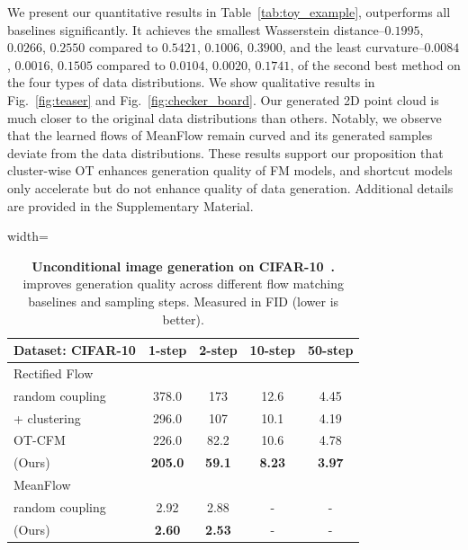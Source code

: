 We present our quantitative results in Table~\ref{tab:toy_example}, \method{} outperforms all baselines significantly.  It achieves the smallest Wasserstein distance--$0.1995$, $0.0266$, $0.2550$ compared to $0.5421$, $0.1006$, $0.3900$, and the least curvature--$0.0084$, $0.0016$, $0.1505$ compared to $0.0104$, $0.0020$, $0.1741$, of the second best method on the four types of data distributions.  We show qualitative results in Fig.~\ref{fig:teaser} and Fig.~\ref{fig:checker_board}.  Our generated 2D point cloud is much closer to the original data distributions than others.  Notably, we observe that the learned flows of MeanFlow remain curved and its generated samples deviate from the data distributions.  These results support our proposition that cluster-wise OT enhances generation quality of FM models, and shortcut models only accelerate but do not enhance quality of data generation.  Additional details are provided in the Supplementary Material.

\begin{table}[t]
\centering
\begin{adjustbox}{width=\linewidth}
\begin{tabular}{l|cccc}
    \toprule
    Dataset: CIFAR-10 & 1-step & 2-step & 10-step & 50-step \\
    \midrule
    Rectified Flow~\cite{liu2022flow} &  &  &  &  \\
    \quad random coupling & 378.0 & 173 & 12.6 & 4.45  \\
    \quad + clustering & 296.0 & 107 & 10.1 & 4.19 \\
    \quad OT-CFM~\cite{tong2024improvinggeneralizingflowbasedgenerative} & 226.0 & 82.2 & 10.6 & 4.78 \\
    \quad \method{} (Ours) & \textbf{205.0} & \textbf{59.1} & \textbf{8.23} & \textbf{3.97} \\
    \midrule
    MeanFlow~\cite{geng2025mean} &  &  &  &  \\
    \quad random coupling & 2.92 & 2.88 &  - & - \\
    \quad \method{} (Ours) & \textbf{2.60} & \textbf{2.53} & - & - \\
    \bottomrule
\end{tabular}
\end{adjustbox}
\caption{\textbf{Unconditional image generation on CIFAR-10~\cite{krizhevsky2009learning}.} \method{} improves generation quality across different flow matching baselines and sampling steps. Measured in FID (lower is better).}
\label{tab:cifar10}
\end{table}

